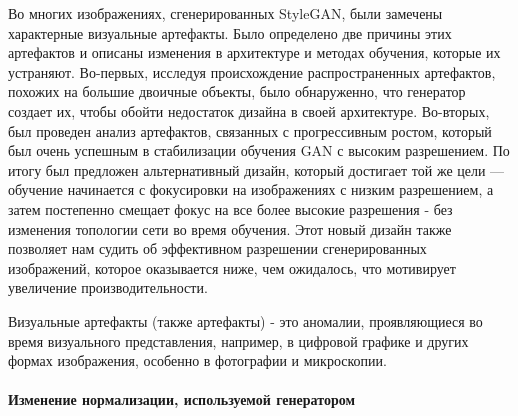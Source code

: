 Во многих изображениях, сгенерированных StyleGAN,  были замечены характерные визуальные артефакты. Было определено две причины этих артефактов и описаны изменения в архитектуре и методах обучения, которые их устраняют. Во-первых, исследуя происхождение распространенных артефактов, похожих на большие двоичные объекты, было обнаруженно, что генератор создает их, чтобы обойти недостаток дизайна в своей архитектуре. Во-вторых, был проведен анализ артефактов, связанных с прогрессивным ростом\cite{progressive_growing_of_gans}, который был очень успешным в стабилизации обучения GAN с высоким разрешением. По итогу был предложен альтернативный дизайн, который достигает той же цели — обучение начинается с фокусировки на изображениях с низким разрешением, а затем постепенно смещает фокус на все более высокие разрешения - без изменения топологии сети во время обучения. Этот новый дизайн также позволяет нам судить об эффективном разрешении сгенерированных изображений, которое оказывается ниже, чем ожидалось, что мотивирует увеличение производительности.\cite{StyleGAN2}

\begin{definition}
    Визуальные артефакты (также артефакты) - это аномалии, проявляющиеся во время визуального представления, например, в цифровой графике и других формах изображения, особенно в фотографии и микроскопии.
\end{definition}

\paragraph{Изменение нормализации, используемой генератором}

